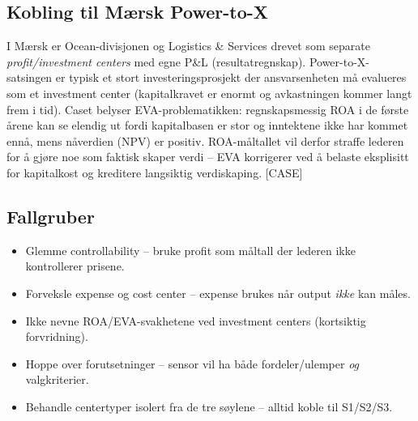 \subsection*{Kobling til Mærsk Power-to-X}
I Mærsk er Ocean-divisjonen og Logistics \& Services drevet som separate \emph{profit/investment centers} med egne P\&L (resultatregnskap). Power-to-X-satsingen er typisk et stort investeringsprosjekt der ansvarsenheten må evalueres som et investment center (kapitalkravet er enormt og avkastningen kommer langt frem i tid). Caset belyser EVA-problematikken: regnskapsmessig ROA i de første årene kan se elendig ut fordi kapitalbasen er stor og inntektene ikke har kommet ennå, mens nåverdien (NPV) er positiv. ROA-måltallet vil derfor straffe lederen for å gjøre noe som faktisk skaper verdi -- EVA korrigerer ved å belaste eksplisitt for kapitalkost og kreditere langsiktig verdiskaping. [CASE]

\subsection*{Fallgruber}
\begin{itemize}\setlength{\itemsep}{2pt}
\item Glemme controllability -- bruke profit som måltall der lederen ikke kontrollerer prisene.
\item Forveksle expense og cost center -- expense brukes når output \emph{ikke} kan måles.
\item Ikke nevne ROA/EVA-svakhetene ved investment centers (kortsiktig forvridning).
\item Hoppe over forutsetninger -- sensor vil ha både fordeler/ulemper \emph{og} valgkriterier.
\item Behandle centertyper isolert fra de tre søylene -- alltid koble til S1/S2/S3.
\end{itemize}

\FloatBarrier
